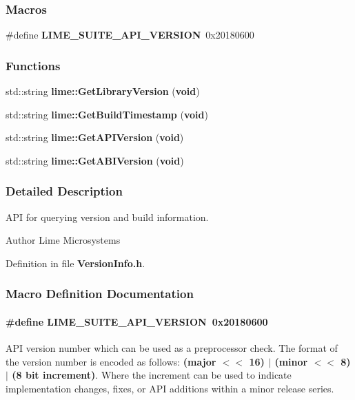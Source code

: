 \subsubsection*{Macros}
\begin{DoxyCompactItemize}
\item 
\#define {\bf L\+I\+M\+E\+\_\+\+S\+U\+I\+T\+E\+\_\+\+A\+P\+I\+\_\+\+V\+E\+R\+S\+I\+ON}~0x20180600
\end{DoxyCompactItemize}
\subsubsection*{Functions}
\begin{DoxyCompactItemize}
\item 
std\+::string {\bf lime\+::\+Get\+Library\+Version} ({\bf void})
\item 
std\+::string {\bf lime\+::\+Get\+Build\+Timestamp} ({\bf void})
\item 
std\+::string {\bf lime\+::\+Get\+A\+P\+I\+Version} ({\bf void})
\item 
std\+::string {\bf lime\+::\+Get\+A\+B\+I\+Version} ({\bf void})
\end{DoxyCompactItemize}


\subsubsection{Detailed Description}
A\+PI for querying version and build information. 

\begin{DoxyAuthor}{Author}
Lime Microsystems 
\end{DoxyAuthor}


Definition in file {\bf Version\+Info.\+h}.



\subsubsection{Macro Definition Documentation}
\paragraph[{L\+I\+M\+E\+\_\+\+S\+U\+I\+T\+E\+\_\+\+A\+P\+I\+\_\+\+V\+E\+R\+S\+I\+ON}]{\setlength{\rightskip}{0pt plus 5cm}\#define L\+I\+M\+E\+\_\+\+S\+U\+I\+T\+E\+\_\+\+A\+P\+I\+\_\+\+V\+E\+R\+S\+I\+ON~0x20180600}\label{VersionInfo_8h_a4e0b6712ce4d9151cdc0f19facc2b5cd}
A\+PI version number which can be used as a preprocessor check. The format of the version number is encoded as follows\+: {\bfseries (major $<$$<$ 16) $\vert$ (minor $<$$<$ 8) $\vert$ (8 bit increment)}. Where the increment can be used to indicate implementation changes, fixes, or A\+PI additions within a minor release series.

